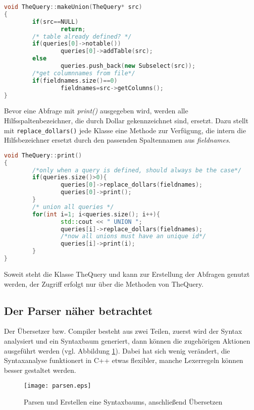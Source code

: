 \begin{lstlisting}[language=C++]
void TheQuery::makeUnion(TheQuery* src)
{
        if(src==NULL)
                return;
        /* table already defined? */
        if(queries[0]->notable())
                queries[0]->addTable(src);
        else
                queries.push_back(new Subselect(src));
        /*get columnnames from file*/
        if(fieldnames.size()==0)
                fieldnames=src->getColumns();
}
\end{lstlisting}

Bevor eine Abfrage mit \textit{print()} ausgegeben wird, werden alle Hilfsspaltenbezeichner, die durch Dollar gekennzeichnet sind, ersetzt. Dazu stellt mit \lstinline{replace_dollars()} jede Klasse eine Methode zur Verfügung, die intern die Hilfsbezeichner ersetzt durch den passenden Spaltennamen aus \textit{fieldnames}.

\begin{lstlisting}[language=C++]
void TheQuery::print()
{
        /*only when a query is defined, should always be the case*/
        if(queries.size()>0){
                queries[0]->replace_dollars(fieldnames);
                queries[0]->print();
        }
        /* union all queries */
        for(int i=1; i<queries.size(); i++){
                std::cout << " UNION ";
                queries[i]->replace_dollars(fieldnames);
                /*now all unions must have an unique id*/
                queries[i]->print(i);
        }
}
\end{lstlisting}

Soweit steht die Klasse TheQuery und kann zur Erstellung der Abfragen genutzt werden, der Zugriff erfolgt nur über die Methoden von TheQuery.

\subsection{Der Parser näher betrachtet}
Der Übersetzer bzw. Compiler besteht aus zwei Teilen, zuerst wird der Syntax analysiert und ein Syntaxbaum generiert, dann können die zugehörigen Aktionen ausgeführt werden (vgl. Abbildung \ref{fig:parsen}). Dabei hat sich wenig verändert, die Syntaxanalyse funktionert in C++ etwas flexibler, manche Lexerregeln können besser gestaltet werden.

\begin{figure}[h]
\centering
\texttt{[image: parsen.eps]}
\caption{Parsen und Erstellen eine Syntaxbaums, anschließend Übersetzen}
\label{fig:parsen}
\end{figure}

